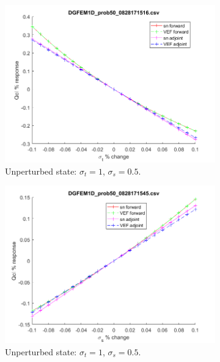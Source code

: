 \documentclass[12pt]{report}
\newcommand{\sigt}{\sigma_t}
\newcommand{\sigs}{\sigma_s}
\begin{document}
\begin{figure}[H]
\begin{subfigure}{.5\textwidth}
  \includegraphics[width=.98\linewidth]{figures/50sigtSens.png}
  \caption{Unperturbed state: $\sigt=1$, $\sigs=0.5$.}
  \label{fig:sfig2}
\end{subfigure}%
\begin{subfigure}{.5\textwidth}
  \centering
  \includegraphics[width=.98\linewidth]{figures/50sigsSens.png}
  \caption{Unperturbed state: $\sigt=1$, $\sigs=0.5$.}
  \label{fig:sfig5}
\end{subfigure}%
\\
\begin{subfigure}{.5\textwidth}
  \centering

\end{subfigure}
\end{figure}
\end{document}

